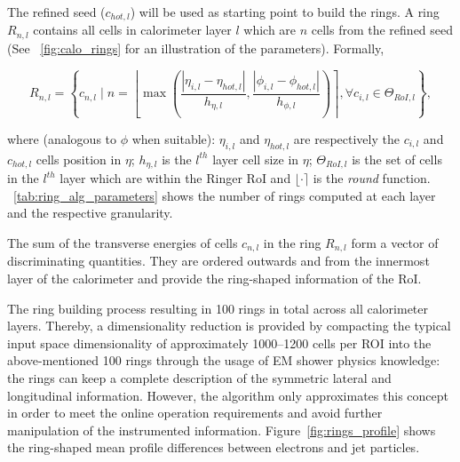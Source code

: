 The refined seed ($c_{hot,l}$) will be used as starting point to build the rings. A ring $R_{n,l}$ contains all cells in calorimeter layer $l$ which are $n$ cells from the refined seed (See \figurename~\ref{fig:calo_rings} for an illustration of the parameters). Formally,


\begin{equation}
R_{n,l} = \left\{c_{n,l} \mid n = \left\lfloor \max{\left( 
\frac{| \eta_{i,l} - \eta_{hot,l} |}{h_{\eta,l}}, 
\frac{| \phi_{i,l} - \phi_{hot,l} |}{h_{\phi,l}} 
\right)} \right\rceil, 
\forall c_{i,l} \in
\Theta_{RoI,l}
\right\},
\end{equation}



\noindent where (analogous to $\phi$ when suitable): $\eta_{i,l}$
and $\eta_{hot,l}$ are respectively the $c_{i,l}$ and $c_{hot,l}$
cells position in $\eta$; $h_{\eta,l}$ is the $l^{th}$ layer cell size in $\eta$; $\Theta_{RoI,l}$ is the set of cells
in the $l^{th}$ layer which are within the Ringer RoI and $\lfloor \cdot \rceil$ is the \textit{round} function.
\tablename~\ref{tab:ring_alg_parameters} shows the number of rings computed at each layer and the respective granularity.



The sum of the transverse energies of cells $c_{n,l}$ in the ring $R_{n,l}$ form a vector of discriminating quantities. They are ordered outwards and from the innermost layer of the calorimeter and provide the ring-shaped information of the RoI.




The ring building process resulting in 100 rings in total across all calorimeter layers. Thereby, a dimensionality reduction is provided by compacting the typical input space dimensionality of approximately 1000--1200 cells per ROI into the above-mentioned 100 rings through the usage of EM shower physics knowledge: the rings can keep a complete description of the symmetric lateral and longitudinal information. However, the algorithm only approximates this concept in order to meet the online operation requirements and avoid further manipulation of the instrumented information. 
Figure~\ref{fig:rings_profile} shows the ring-shaped mean profile differences between electrons and jet particles. 



